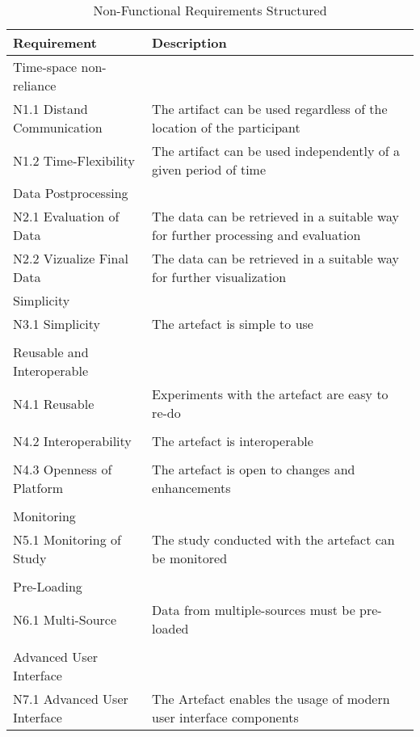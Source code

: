 \begin{table}
    \centering
    \small
    \begin{tabular}{L{0.35\textwidth}L{0.59\textwidth}}
    \hline
Requirement                             & Description \\ \hline
    Time-space non-reliance     &             \\ \hline
    N1.1 Distand Communication      & The artifact can be used regardless of the location of the participant            \\
    N1.2 Time-Flexibility           & The artifact can be used independently of a given period of time            \\ \hline
    Data Postprocessing &             \\ \hline
    N2.1 Evaluation of Data         & The data can be retrieved in a suitable way for further processing and evaluation            \\
    N2.2 Vizualize Final Data       & The data can be retrieved in a suitable way for further visualization             \\ \hline
    Simplicity                  &            \\ \hline
    N3.1 Simplicity                 & The artefact is simple to use           \\
    & \\ \hline
    Reusable and Interoperable  &             \\ \hline
    N4.1 Reusable                   & Experiments with the artefact are easy to re-do           \\
    & \\
    N4.2 Interoperability           & The artefact is interoperable            \\
    & \\
    N4.3 Openness of Platform       & The artefact is open to changes and enhancements \\
    & \\ \hline
    Monitoring                  &             \\ \hline
    N5.1 Monitoring of Study        & The study conducted with the artefact can be monitored            \\ 
    & \\ \hline
    Pre-Loading                 &             \\ \hline
    N6.1 Multi-Source             & Data from multiple-sources must be pre-loaded            \\ 
    & \\ \hline
    Advanced User Interface   &             \\ \hline
    N7.1 Advanced User Interface  & The Artefact enables the usage of modern user interface components            \\ \hline
    \end{tabular}
    \caption[Non-Functional Requirements Structured]{Non-Functional Requirements Structured}\label{tab:NonFuncRequirementsCat}
    \end{table}
